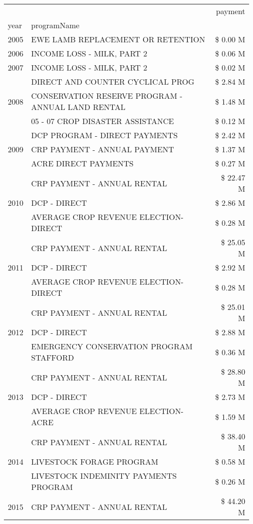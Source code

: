 \begin{tabular}{llr}
\toprule
 &  & payment \\
year & programName &  \\
\midrule
2005 & EWE LAMB REPLACEMENT OR RETENTION & \$ 0.00 M \\
\cline{1-3}
2006 & INCOME LOSS - MILK, PART 2 & \$ 0.06 M \\
\cline{1-3}
2007 & INCOME LOSS - MILK, PART 2 & \$ 0.02 M \\
\cline{1-3}
\multirow[t]{3}{*}{2008} & DIRECT AND COUNTER CYCLICAL PROG & \$ 2.84 M \\
 & CONSERVATION RESERVE PROGRAM - ANNUAL LAND RENTAL & \$ 1.48 M \\
 & 05 - 07 CROP DISASTER ASSISTANCE & \$ 0.12 M \\
\cline{1-3}
\multirow[t]{3}{*}{2009} & DCP PROGRAM - DIRECT PAYMENTS & \$ 2.42 M \\
 & CRP PAYMENT - ANNUAL PAYMENT & \$ 1.37 M \\
 & ACRE DIRECT PAYMENTS & \$ 0.27 M \\
\cline{1-3}
\multirow[t]{3}{*}{2010} & CRP PAYMENT - ANNUAL RENTAL & \$ 22.47 M \\
 & DCP - DIRECT & \$ 2.86 M \\
 & AVERAGE CROP REVENUE ELECTION-DIRECT & \$ 0.28 M \\
\cline{1-3}
\multirow[t]{3}{*}{2011} & CRP PAYMENT - ANNUAL RENTAL & \$ 25.05 M \\
 & DCP - DIRECT & \$ 2.92 M \\
 & AVERAGE CROP REVENUE ELECTION-DIRECT & \$ 0.28 M \\
\cline{1-3}
\multirow[t]{3}{*}{2012} & CRP PAYMENT - ANNUAL RENTAL & \$ 25.01 M \\
 & DCP - DIRECT & \$ 2.88 M \\
 & EMERGENCY CONSERVATION PROGRAM STAFFORD & \$ 0.36 M \\
\cline{1-3}
\multirow[t]{3}{*}{2013} & CRP PAYMENT - ANNUAL RENTAL & \$ 28.80 M \\
 & DCP - DIRECT & \$ 2.73 M \\
 & AVERAGE CROP REVENUE ELECTION-ACRE & \$ 1.59 M \\
\cline{1-3}
\multirow[t]{3}{*}{2014} & CRP PAYMENT - ANNUAL RENTAL & \$ 38.40 M \\
 & LIVESTOCK FORAGE PROGRAM & \$ 0.58 M \\
 & LIVESTOCK INDEMINITY PAYMENTS PROGRAM & \$ 0.26 M \\
\cline{1-3}
\multirow[t]{3}{*}{2015} & CRP PAYMENT - ANNUAL RENTAL & \$ 44.20 M \\

\end{tabular}
